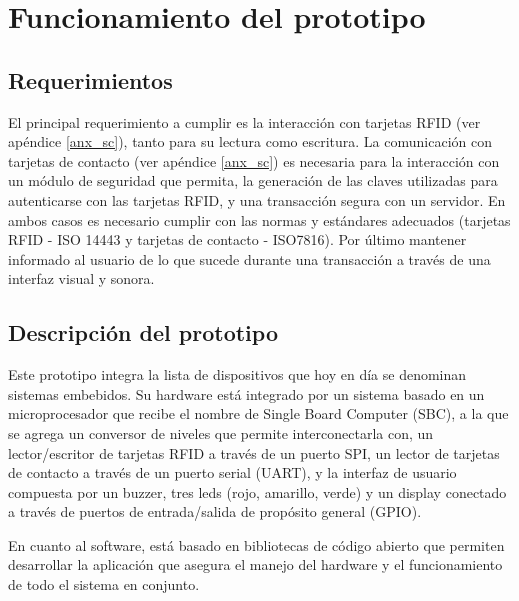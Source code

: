 \chapter{Funcionamiento del prototipo}

\section{Requerimientos}
El principal requerimiento a cumplir es la interacción con tarjetas RFID (ver apéndice \ref{anx_sc}), tanto para su lectura como escritura.
La comunicación con tarjetas de contacto (ver apéndice \ref{anx_sc}) es necesaria para la interacción con un módulo de seguridad que permita, la generación de las claves utilizadas para autenticarse con las tarjetas RFID, y una transacción segura con un servidor. En ambos casos es necesario cumplir con las normas y estándares adecuados  (tarjetas RFID - ISO 14443 y tarjetas de contacto - ISO7816).
Por último mantener informado al usuario de lo que sucede durante una transacción a través de una interfaz visual y sonora.


\section{Descripción del prototipo}
Este prototipo integra la lista de dispositivos que hoy en día se denominan sistemas embebidos. Su hardware está integrado por un sistema basado en un microprocesador que  recibe el nombre de Single Board Computer (SBC), a la que se agrega un conversor de niveles que permite interconectarla con, un lector/escritor de tarjetas RFID a través de un puerto SPI, un lector de tarjetas de contacto a través de un puerto serial (UART), y la interfaz de usuario compuesta por un buzzer, tres leds (rojo, amarillo, verde) y un display conectado a través de puertos de entrada/salida de propósito general (GPIO).

\bigskip
En cuanto al software, está basado en bibliotecas de código abierto que permiten desarrollar la aplicación que asegura el manejo del hardware y el funcionamiento de todo el sistema en conjunto.


